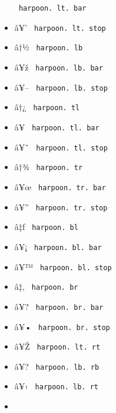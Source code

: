\begin{itemize}
{  \texttt{\ harpoon.\ lt.\ bar\ }}
\item
  \label{symbol-harpoon.lt.stop}{{ â¥' }
  \texttt{\ harpoon.\ lt.\ stop\ }}
\item
  \label{symbol-harpoon.lb}{{ â†½ }
  \texttt{\ harpoon.\ lb\ }}
\item
  \label{symbol-harpoon.lb.bar}{{ â¥ž }
  \texttt{\ harpoon.\ lb.\ bar\ }}
\item
  \label{symbol-harpoon.lb.stop}{{ â¥-- }
  \texttt{\ harpoon.\ lb.\ stop\ }}
\item
  \label{symbol-harpoon.tl}{{ â†¿ }
  \texttt{\ harpoon.\ tl\ }}
\item
  \label{symbol-harpoon.tl.bar}{{ â¥ }
  \texttt{\ harpoon.\ tl.\ bar\ }}
\item
  \label{symbol-harpoon.tl.stop}{{ â¥˜ }
  \texttt{\ harpoon.\ tl.\ stop\ }}
\item
  \label{symbol-harpoon.tr}{{ â†¾ }
  \texttt{\ harpoon.\ tr\ }}
\item
  \label{symbol-harpoon.tr.bar}{{ â¥œ }
  \texttt{\ harpoon.\ tr.\ bar\ }}
\item
  \label{symbol-harpoon.tr.stop}{{ â¥'' }
  \texttt{\ harpoon.\ tr.\ stop\ }}
\item
  \label{symbol-harpoon.bl}{{ â‡ƒ }
  \texttt{\ harpoon.\ bl\ }}
\item
  \label{symbol-harpoon.bl.bar}{{ â¥¡ }
  \texttt{\ harpoon.\ bl.\ bar\ }}
\item
  \label{symbol-harpoon.bl.stop}{{ â¥™ }
  \texttt{\ harpoon.\ bl.\ stop\ }}
\item
  \label{symbol-harpoon.br}{{ â‡‚ }
  \texttt{\ harpoon.\ br\ }}
\item
  \label{symbol-harpoon.br.bar}{{ â¥? }
  \texttt{\ harpoon.\ br.\ bar\ }}
\item
  \label{symbol-harpoon.br.stop}{{ â¥• }
  \texttt{\ harpoon.\ br.\ stop\ }}
\item
  \label{symbol-harpoon.lt.rt}{{ â¥Ž }
  \texttt{\ harpoon.\ lt.\ rt\ }}
\item
  \label{symbol-harpoon.lb.rb}{{ â¥? }
  \texttt{\ harpoon.\ lb.\ rb\ }}
\item
  \label{symbol-harpoon.lb.rt}{{ â¥‹ }
  \texttt{\ harpoon.\ lb.\ rt\ }}
\item

\end{itemize}
